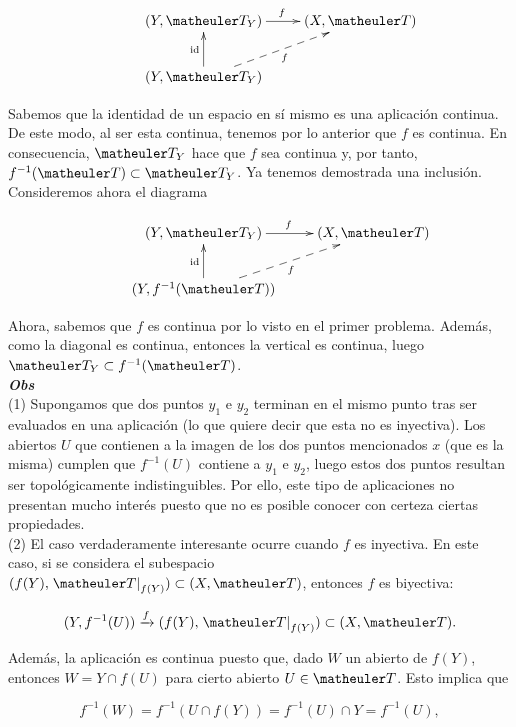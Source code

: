 \begin{equation*}
\xymatrix{
&(Y,\T_Y) \ar[r]^f
&(X,\T) \\
&(Y,\T_Y) \ar@{-->}[ru]_f \ar[u]^{\text{id}}}
\end{equation*}

Sabemos que la identidad de un espacio en sí mismo es una aplicación continua. De este modo, al ser esta continua, tenemos por lo anterior que $f$ es continua. En consecuencia, $\T_Y$ hace que $f$ sea continua y, por tanto, $f^{-1}(\T)\subset \T_Y$. Ya tenemos demostrada una inclusión. \\

Consideremos ahora el diagrama 

\begin{equation*}
\xymatrix{
&(Y,\T_Y) \ar[r]^f
&(X,\T) \\
&(Y,f^{-1}(\T)) \ar@{-->}[ru]_f \ar[u]^{\text{id}}}
\end{equation*}

Ahora, sabemos que $f$ es continua por lo visto en el primer problema. Además, como la diagonal es continua, entonces la vertical es continua, luego $\T_Y \subset f^{-1}(\T)$. \\

\textbf{\textit{Obs}} \\

(1) Supongamos que dos puntos $y_1$ e $y_2$ terminan en el mismo punto tras ser evaluados en una aplicación (lo que quiere decir que esta no es inyectiva). Los abiertos $U$ que contienen a la imagen de los dos puntos mencionados $x$ (que es la misma) cumplen que $f^{-1}(U)$ contiene a $y_1$ e $y_2$, luego estos dos puntos resultan ser topológicamente indistinguibles. Por ello, este tipo de aplicaciones no presentan mucho interés puesto que no es posible conocer con certeza ciertas propiedades. \\

(2) El caso verdaderamente interesante ocurre cuando $f$ es inyectiva. En este caso, si se considera el subespacio $(f(Y),\left.\T\right|_{f(Y)}) \subset (X,\T)$, entonces $f$ es biyectiva:

\[(Y,f^{-1}(U)) \xrightarrow{f} (f(Y),\left.\T\right|_{f(Y)}) \subset (X,\T).\]

Además, la aplicación es continua puesto que, dado $W$ un abierto de $f(Y)$, entonces $W=Y\cap f(U)$ para cierto abierto $U\in \T$. Esto implica que

\[f^{-1}(W)=f^{-1}(U\cap f(Y))=f^{-1}(U)\cap Y=f^{-1}(U),\]

